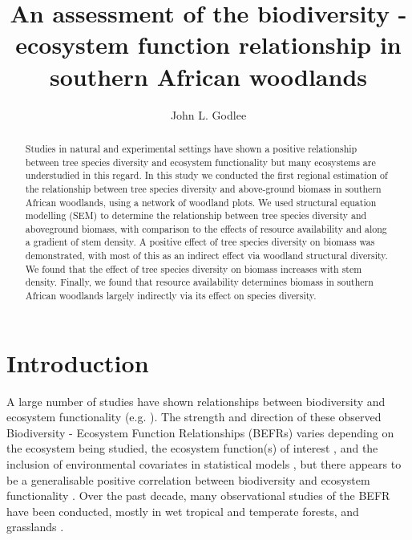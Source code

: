 \documentclass[11pt,a4paper]{article}
\title{An assessment of the biodiversity - ecosystem function relationship in southern African woodlands}
\author{John L. Godlee}
\date{}
\begin{document}
\maketitle
\tableofcontents
\newpage{}

\begin{abstract}
	Studies in natural and experimental settings have shown a positive relationship between tree species diversity and ecosystem functionality but many ecosystems are understudied in this regard. In this study we conducted the first regional estimation of the relationship between tree species diversity and above-ground biomass in southern African woodlands, using a network of \nplots{} woodland plots. We used structural equation modelling (SEM) to determine the relationship between tree species diversity and aboveground biomass, with comparison to the effects of resource availability and along a gradient of stem density. A positive effect of tree species diversity on biomass was demonstrated, with most of this as an indirect effect via woodland structural diversity. We found that the effect of tree species diversity on biomass increases with stem density. Finally, we found that resource availability determines biomass in southern African woodlands largely indirectly via its effect on species diversity.
\end{abstract}

\section{Introduction}

A large number of studies have shown relationships between biodiversity and ecosystem functionality (e.g. \citealt{Liang2016, Cardinale2009}). The strength and direction of these observed Biodiversity - Ecosystem Function Relationships (BEFRs) varies depending on the ecosystem being studied, the ecosystem function(s) of interest \citep{Hector2007}, and the inclusion of environmental covariates in statistical models \citep{Vila2005}, but there appears to be a generalisable positive correlation between biodiversity and ecosystem functionality \citep{Liang2016}. Over the past decade, many observational studies of the BEFR have been conducted, mostly in wet tropical and temperate forests, and grasslands \citep{Chen2011}. %
\end{document}

